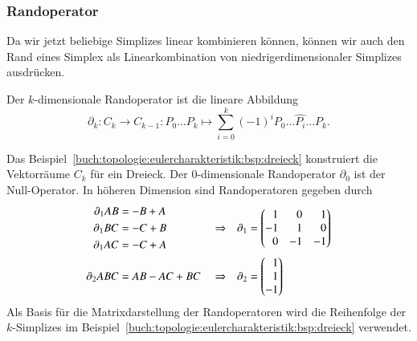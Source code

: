 %
%
\subsubsection{Randoperator}
Da wir jetzt beliebige Simplizes linear kombinieren können, können
wir auch den Rand eines Simplex als Linearkombination von
niedrigerdimensionaler Simplizes ausdrücken.

\begin{definition}[Randoperator]
Der $k$-dimensionale Randoperator ist die lineare Abbildung
\[
\partial_k
\colon
C_k \to C_{k-1}
:
P_0\dots P_k
\mapsto
\sum_{i=0}^k
(-1)^i
P_0\dots\widehat{P_i}\dots P_k.
\]
%
\end{definition}

\begin{beispiel}
\label{buch:topologie:eulercharakteristik:bsp:dreieckrand}
Das Beispiel~\ref{buch:topologie:eulercharakteristik:bsp:dreieck}
konstruiert die Vektorräume $C_k$ für ein Dreieck.
%
Der $0$-dimensionale Randoperator $\partial_0$ ist der Null-Operator.
In höheren Dimension sind Randoperatoren gegeben durch
\begin{align*}
\partial_1 AB &= -B + A &&&&\\
\partial_1 BC &= -C + B &
&\Rightarrow
&\partial_1&=\smash{\begin{pmatrix*}[r]
 1 &  0 &  1 \\
-1 &  1 &  0 \\
 0 & -1 & -1
\end{pmatrix*}}
\\
\partial_1 AC &= -C + A \\
\partial_2 ABC &= AB - AC + BC&&\Rightarrow&\partial_2&=\begin{pmatrix*}[r]1\\1\\-1\end{pmatrix*}
\end{align*}
Als Basis für die Matrixdarstellung der Randoperatoren wird die
Reihenfolge der $k$-Simplizes im
Beispiel~\ref{buch:topologie:eulercharakteristik:bsp:dreieck}
verwendet.


\end{beispiel}
